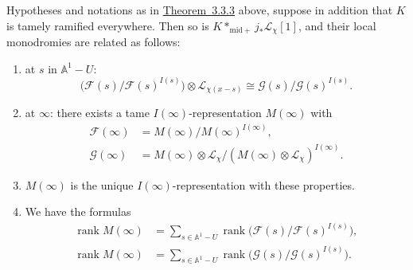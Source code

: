 Hypotheses and notations as in \hyperref[thm:3.3.3]{Theorem~3.3.3} above,
suppose in addition that \(K\) is tamely ramified everywhere. Then so is
\(K*_{\mathrm{mid}+}j_*\mathcal{L}_{\chi}[1]\), and their local monodromies are
related as follows:
\begin{enumerate}[label=(\arabic*)]
\item at \(s\) in \(\mathbb{A}^1-U\):
\[
  \bigl(\mathcal{F}(s)/\mathcal{F}(s)^{I(s)}\bigr)
  \otimes\mathcal{L}_{\chi(x-s)}
  \cong
  \mathcal{G}(s)/\mathcal{G}(s)^{I(s)}.
\]
\item at \(\infty\): there exists a tame \(I(\infty)\)-representation
\(M(\infty)\) with
\[
\begin{aligned}
  \mathcal{F}(\infty)
  &=
  M(\infty)/M(\infty)^{I(\infty)},\\
  \mathcal{G}(\infty)
  &=
  M(\infty)\otimes\mathcal{L}_{\chi}/
  (M(\infty)\otimes\mathcal{L}_{\chi})^{I(\infty)}.
\end{aligned}
\]
\item \(M(\infty)\) is the unique \(I(\infty)\)-representation with these
properties.
\item We have the formulas
\[
\begin{aligned}
  \operatorname{rank}M(\infty)
  &=
  \sum_{s\in\mathbb{A}^1-U}
  \operatorname{rank}\bigl(\mathcal{F}(s)/\mathcal{F}(s)^{I(s)}\bigr),\\
  \operatorname{rank}M(\infty)
  &=
  \sum_{s\in\mathbb{A}^1-U}
  \operatorname{rank}\bigl(\mathcal{G}(s)/\mathcal{G}(s)^{I(s)}\bigr).
\end{aligned}
\]
\end{enumerate}

